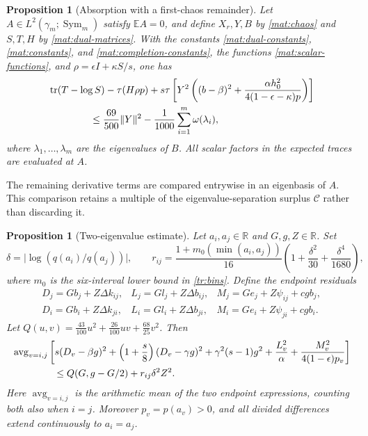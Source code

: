 \documentclass[11pt]{article}
\newcommand{\R}{\mathbb R}
\newcommand{\E}{\mathbb E}
\DeclareMathOperator{\tr}{tr}
\newcommand{\Id}{I}
\newtheorem{proposition}[theorem]{Proposition}
\theoremstyle{definition}
\theoremstyle{remark}
\numberwithin{equation}{section}
\begin{document}
\begin{proposition}[Absorption with a first-chaos remainder]
\label{mat:scalar-absorption}
Let $A\in L^2(\gamma_m;\operatorname{Sym}_m)$ satisfy $\E A=0$, and
define $X_r,Y,B$ by \eqref{mat:chaos} and $S,T,H$ by
\eqref{mat:dual-matrices}.  With the constants
\eqref{mat:dual-constants}, \eqref{mat:constants}, and
\eqref{mat:completion-constants}, the functions \eqref{mat:scalar-functions}, and
$\rho=\epsilon\Id+\kappa S/s$, one has
\begin{equation}\label{mat:absorption-inequality}
 \begin{split}
 &\tr(T-\log S)-\tau(H\rho p)
 +s\tau\left[Y^2\left((b-\beta)^2+
       \frac{\alpha h_0^2}{4(1-\epsilon-\kappa)p}\right)\right]\\
 &\hspace{15mm}\le\frac{69}{500}\|Y\|^2
       -\frac1{1000}\sum_{i=1}^m\omega(\lambda_i),
 \end{split}
\end{equation}
where $\lambda_1,\ldots,\lambda_m$ are the eigenvalues of $B$.
All scalar factors in the expected traces are evaluated at $A$.
\end{proposition}

The remaining derivative terms are compared entrywise in an eigenbasis
of $A$.  This comparison retains a multiple of the eigenvalue-separation
surplus $\mathcal C$ rather than discarding it.

\begin{proposition}[Two-eigenvalue estimate]\label{mat:scalar-pair}
Let $a_i,a_j\in\R$ and $G,g,Z\in\R$.  Set
\[
 \delta=\bigl|\log(q(a_i)/q(a_j))\bigr|,\qquad
 r_{ij}=\frac{1+m_0(\min(a_i,a_j))}{16}
       \left(1+\frac{\delta^2}{30}+\frac{\delta^4}{1680}\right),
\]
where $m_0$ is the six-interval lower bound in \eqref{tr:bins}.  Define the endpoint residuals
\[
 \begin{array}{lll}
 D_j=Gb_j+Z\Delta k_{ij},&L_j=Gl_j+Z\Delta b_{ij},&
 M_j=Ge_j+Z\psi_{ij}+cgb_j,\\
 D_i=Gb_i+Z\Delta k_{ji},&L_i=Gl_i+Z\Delta b_{ji},&
 M_i=Ge_i+Z\psi_{ji}+cgb_i.
 \end{array}
\]
Let
$Q(u,v)=\frac{43}{100}u^2+\frac{26}{100}uv+\frac{68}{25}v^2$.
Then
\begin{align}
 &\operatorname{avg}_{v=i,j}\left[
 s(D_v-\beta g)^2+\left(1+\frac s8\right)(D_v-\gamma g)^2
 +\gamma^2(s-1)g^2+\frac{L_v^2}{\alpha}
 +\frac{M_v^2}{4(1-\epsilon)p_v}\right]\notag\\
 &\hspace{15mm}\le Q(G,g-G/2)+r_{ij}\delta^2Z^2.
 \label{mat:pair-inequality}
\end{align}
Here $\operatorname{avg}_{v=i,j}$ is the arithmetic mean of the two
endpoint expressions, counting both also when $i=j$.  Moreover
$p_v=p(a_v)>0$, and all divided differences extend continuously to
$a_i=a_j$.
\end{proposition}
\end{document}
